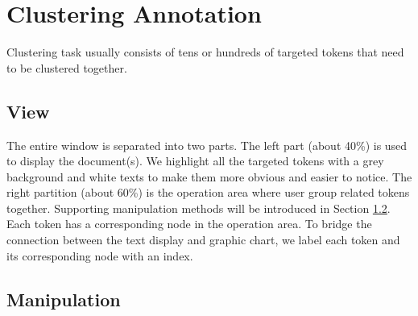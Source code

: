 \section{Clustering Annotation}

Clustering task usually consists of tens or hundreds of targeted tokens that need to be clustered together. 

\subsection{View}

The entire window is separated into two parts. The left part (about 40\%) is used to display the document(s). We highlight all the targeted tokens with a grey background and white texts to make them more obvious and easier to notice. The right partition (about 60\%) is the operation area where user group related tokens together. Supporting manipulation methods will be introduced in Section \ref{sec:manipulation}. Each token has a corresponding node in the operation area. To bridge the connection between the text display and graphic chart, we label each token and its corresponding node with an index.

\subsection{Manipulation}
\label{sec:manipulation}

